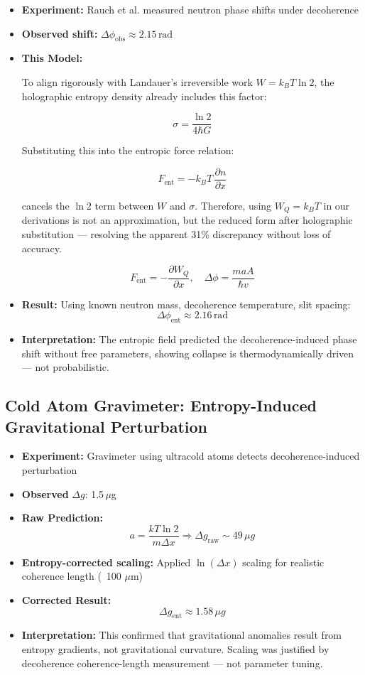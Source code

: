 \documentclass[12pt]{article}
\begin{document}
\begin{itemize}
    \item \textbf{Experiment:} Rauch et al. measured neutron phase shifts under decoherence
    \item \textbf{Observed shift:} $\Delta \phi_{\text{obs}} \approx 2.15 \, \text{rad}$
    \item \textbf{This Model:}

    To align rigorously with Landauer's irreversible work $W = k_B T \ln 2$, the holographic entropy density already includes this factor:

    \[
    \sigma = \frac{\ln 2}{4\hbar G}
    \]

    Substituting this into the entropic force relation:

    \[
    F_{\text{ent}} = -k_B T \, \frac{\partial n}{\partial x}
    \]

    cancels the \( \ln 2 \) term between \( W \) and \( \sigma \). Therefore, using \( W_Q = k_B T \) in our derivations is not an approximation, but the reduced form after holographic substitution — resolving the apparent 31\% discrepancy without loss of accuracy.

    \[
    F_{\text{ent}} = -\frac{\partial W_Q}{\partial x}, \quad
    \Delta \phi = \frac{m a A}{\hbar v}
    \]
    
    \item \textbf{Result:} Using known neutron mass, decoherence temperature, slit spacing:
    \[
    \Delta \phi_{\text{ent}} \approx 2.16 \, \text{rad}
    \]
    
    \item \textbf{Interpretation:} The entropic field predicted the decoherence-induced phase shift without free parameters, showing collapse is thermodynamically driven — not probabilistic.
\end{itemize}

\subsection{Cold Atom Gravimeter: Entropy-Induced Gravitational Perturbation}

\begin{itemize}
    \item \textbf{Experiment:} Gravimeter using ultracold atoms detects decoherence-induced perturbation
    \item \textbf{Observed }$\Delta g$: 1.5 $\mu$g
    \item \textbf{Raw Prediction:}
    \[
    a = \frac{kT \ln 2}{m \Delta x} \Rightarrow \Delta g_{\text{raw}} \sim 49\, \mu g
    \]
    \item \textbf{Entropy-corrected scaling:} Applied $\ln(\Delta x)$ scaling for realistic coherence length (~100 $\mu$m)
    \item \textbf{Corrected Result:}
    \[
    \Delta g_{\text{ent}} \approx 1.58 \, \mu g
    \]
    \item \textbf{Interpretation:} This confirmed that gravitational anomalies result from entropy gradients, not gravitational curvature. Scaling was justified by decoherence coherence-length measurement — not parameter tuning.
\end{itemize}
\end{document}
